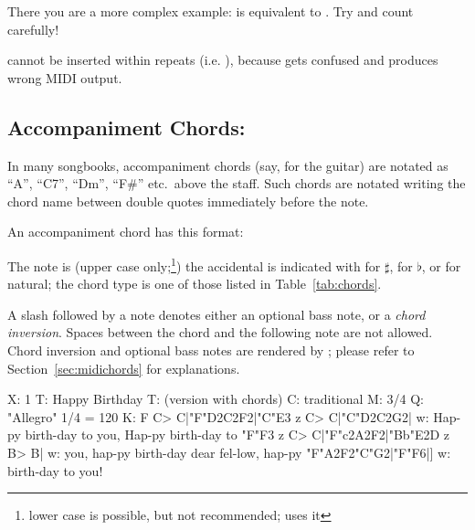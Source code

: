 \documentclass[a4paper,12pt]{book}
\begin{document}
There you are a more complex example:  is
equivalent to . Try and
count carefully!

\begin{vimp}

   cannot be inserted within repeats (i.e.
  \cmd{|:}{\ldots}\cmd{:|}), because \abcmid{} gets confused and
  produces wrong MIDI output.

\end{vimp}


\subsection{Accompaniment Chords: }
\label{sec:acchords}

In many songbooks, accompaniment chords (say, for the guitar) are
notated as ``A'', ``C7'', ``Dm'', ``F\#'' etc.\ above the staff. Such
chords are notated writing the chord name between double quotes
 immediately before the note.

An accompaniment chord has this format:

\medskip

   

\medskip

The note is  (upper case only;\footnote{lower
case is possible, but not recommended; \abcMID{} uses it}) the
accidental is indicated with \car{\#} for $\sharp$,  for
$\flat$, or \car{=} for natural; the chord type is one of those listed
in Table~\ref{tab:chords}.

A slash \car{/} followed by a note  denotes
either an optional bass note, or a \emph{chord inversion}. Spaces
between the chord and the following note are not allowed. Chord
inversion and optional bass notes are rendered by \abcmid{}; please
refer to Section~\ref{sec:midichords} for explanations. 

\begin{abcsource}
X: 1
T: Happy Birthday
T: (version with chords)
C: traditional
M: 3/4
Q: "Allegro" 1/4 = 120 %
K: F
C> C|"F"D2C2F2|"C"E3 z C> C|"C"D2C2G2|
w: Hap-py birth-day to you, Hap-py birth-day to
"F"F3 z C> C|"F"c2A2F2|"Bb"E2D z B> B|
w: you, hap-py birth-day dear fel-low, hap-py
"F"A2F2"C"G2|"F"F6|]
w: birth-day to you!
\end{abcsource}
\end{document}

